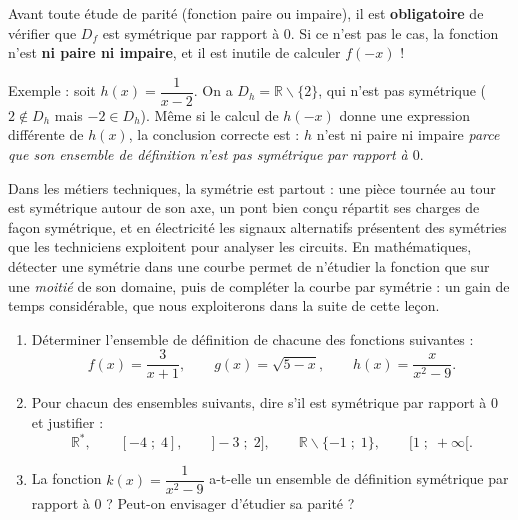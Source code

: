 \documentclass[11pt]{article}
\def\setminus{\mathbin{\backslash}}\let\smallsetminus\setminus
\begin{document}
\begin{attention}
Avant toute étude de parité (fonction paire ou impaire), il est \textbf{obligatoire} de vérifier que $D_f$ est symétrique par rapport à $0$. Si ce n'est pas le cas, la fonction n'est \textbf{ni paire ni impaire}, et il est inutile de calculer $f(-x)$ !

Exemple : soit $h(x) = \dfrac{1}{x - 2}$. On a $D_h = \mathbb{R} \setminus \{2\}$, qui n'est pas symétrique ($2 \notin D_h$ mais $-2 \in D_h$). Même si le calcul de $h(-x)$ donne une expression différente de $h(x)$, la conclusion correcte est : $h$ n'est ni paire ni impaire \emph{parce que son ensemble de définition n'est pas symétrique par rapport à $0$}.
\end{attention}

\begin{savaistu}
Dans les métiers techniques, la symétrie est partout : une pièce tournée au tour est symétrique autour de son axe, un pont bien conçu répartit ses charges de façon symétrique, et en électricité les signaux alternatifs présentent des symétries que les techniciens exploitent pour analyser les circuits. En mathématiques, détecter une symétrie dans une courbe permet de n'étudier la fonction que sur une \emph{moitié} de son domaine, puis de compléter la courbe par symétrie : un gain de temps considérable, que nous exploiterons dans la suite de cette leçon.
\end{savaistu}

\begin{exercice}
\begin{enumerate}
\item Déterminer l'ensemble de définition de chacune des fonctions suivantes :
\[ f(x) = \frac{3}{x+1}, \qquad g(x) = \sqrt{5 - x}, \qquad h(x) = \frac{x}{x^2 - 9}. \]
\item Pour chacun des ensembles suivants, dire s'il est symétrique par rapport à $0$ et justifier :
\[ \mathbb{R}^*, \qquad [-4 \; ; \; 4], \qquad ]-3 \; ; \; 2], \qquad \mathbb{R} \setminus \{-1 \; ; \; 1\}, \qquad [1 \; ; \; +\infty[. \]
\item La fonction $k(x) = \dfrac{1}{x^2 - 9}$ a-t-elle un ensemble de définition symétrique par rapport à $0$ ? Peut-on envisager d'étudier sa parité ?
\end{enumerate}
\end{exercice}
\end{document}
